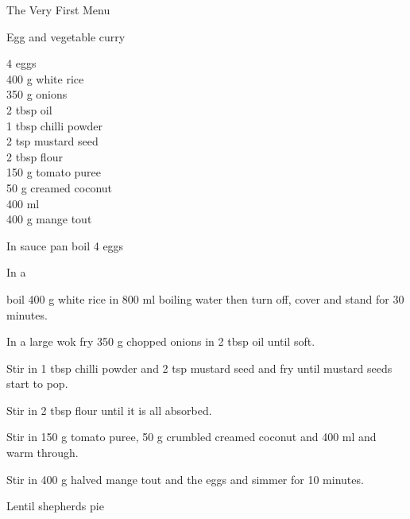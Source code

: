\begin{menu}{The Very First Menu}
\begin{recipe}{2}{Egg and vegetable curry}
		\begin{ingredients}
		4  eggs  \\
	400 g white rice  \\
	350 g onions  \\
	2 tbsp oil  \\
	1 tbsp chilli powder  \\
	2 tsp mustard seed  \\
	2 tbsp flour  \\
	150 g tomato puree  \\
	50 g creamed coconut  \\
	400 ml   \\
	400 g mange tout  \\
	
		\end{ingredients}
	
    \begin{instructions}
    \item 
        In sauce pan boil
        4   eggs\item 
      In a 
       
      boil 
      400 g  white rice
      in 
      800 ml  boiling water
      then turn off, cover and stand for 30 minutes.
    \item 
        In a large wok fry
        350 g chopped onions
        in
        2 tbsp  oil
        until soft.
      \item 
        Stir in 1 tbsp  chilli powder
        and
        2 tsp  mustard seed
        and fry until mustard seeds start to pop.
      \item 
        Stir in
        2 tbsp  flour
        until it is all absorbed.
      \item 
        Stir in
        150 g  tomato puree,
        50 g crumbled creamed coconut
        and
        400 ml  
        and warm through.
      \item 
        Stir in
        400 g halved mange tout
        and the eggs
        and simmer for 10 minutes.
      
    \end{instructions}
    \end{recipe}%
  
    \begin{recipe}{2}{Lentil shepherds pie}%
    
	

\end{recipe}
\end{menu}
